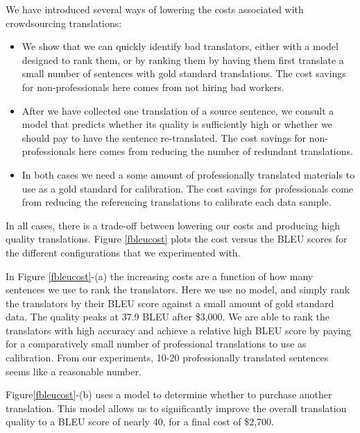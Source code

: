 \documentclass[11pt,letterpaper]{article}
\begin{document}
 We have introduced several ways of lowering the costs associated with crowdsourcing translations:
\begin{itemize}
\item We show that we can quickly identify bad translators, either with a model designed to rank them, or by ranking them by having them first translate a small number of sentences with gold standard translations. The cost savings for non-professionals here comes from not hiring bad workers.
\item After we have collected one translation of a source sentence, we consult a model that predicts whether its quality is sufficiently high or whether we should pay to have the sentence re-translated.  The cost savings for non-professionals here comes from reducing the number of redundant translations.
\item In both cases we need a some amount of professionally translated materials  to use as a gold standard for calibration. The cost savings for professionals come from reducing the referencing translations to calibrate each data sample. 
\end{itemize}
In all cases, there is a trade-off between lowering our costs and producing high quality translations.  Figure \ref{fbleucost} plots the cost versus the BLEU scores for the different configurations that we experimented with.

In Figure \ref{fbleucost}-(a) the increasing costs are a function of how many sentences we use to rank the translators.  Here we use no model, and simply rank the translators by their BLEU score against a small amount of gold standard data. The quality peaks at 37.9 BLEU after \$3,000.
We are able to rank the translators with high accuracy and achieve a relative high BLEU score by paying for a comparatively small number of professional translations to use as calibration. From our experiments,  10-20 professionally translated sentences seems like a reasonable number. 

Figure\ref{fbleucost}-(b) uses a model to determine whether to purchase another translation.  
This model allows us to significantly improve the overall translation quality to a BLEU score of nearly 40, for a final cost of \$2,700.
\end{document}

